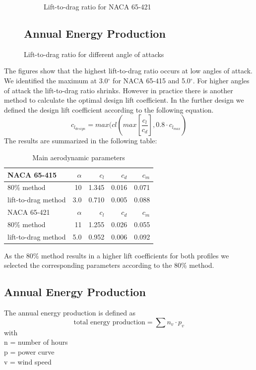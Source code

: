 \documentclass[10pt]{article}
\begin{document}
\begin{figure}[htb!]
\begin{subfigure}{0.5\textwidth}
  \caption{Lift-to-drag ratio for NACA 65-421}
\end{subfigure}\subsection{Annual Energy Production}
\caption{Lift-to-drag ratio for different angle of attacks}
\label{fig:comparison_lift_to_drag}
\end{figure}

The figures show that the highest lift-to-drag ratio occurs at low angles of attack. We identified the maximum at 3.0$^\circ$ for NACA 65-415 and 5.0$^\circ$. For higher angles of attack the lift-to-drag ratio shrinks. However in practice there is another method to calculate the optimal design lift coefficient. In the further design we defined the design lift coefficient according to the following equation.
\begin{equation}
c_{l_{design}} = max(cl(max[\frac{c_l}{c_d}], 0.8\cdot c_{l_{max}})
\end{equation}
The results are summarized in the following table:\\
\begin{table}[H]
\begin{tabular}{l | r r r r}
NACA 65-415 & $\alpha$ &$c_l$ &$c_d$ & $c_m$\\
\hline
80\% method& 10 & 1.345 & 0.016 & 0.071\\
lift-to-drag method & 3.0 & 0.710 & 0.005 &  0.088\\
\hline
NACA 65-421 & $\alpha$ &$c_l$ &$c_d$ & $c_m$\\
\hline
80\% method& 11 & 1.255 & 0.026 & 0.055\\
lift-to-drag method & 5.0 & 0.952 & 0.006 &  0.092\\
\end{tabular}
\caption{Main aerodynamic parameters}
\end{table}

As the 80\% method results in a higher lift coefficients for both profiles we selected the corresponding parameters according to the 80\% method.
\newpage
\subsection{Annual Energy Production}
The annual energy production is defined as 
\begin{equation}
\text{total energy production} = \sum n_v \cdot p_v
\end{equation}
with\\
n = number of hours \\
p = power curve\\
v = wind speed\\
\end{document}

